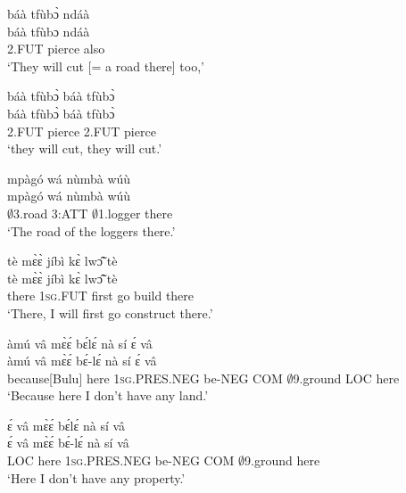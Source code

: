 \begin{exe} 
\exC\label{71} 
  \glll   báà tfùbɔ̀ ndáà \\
        báà tfùbɔ ndáà \\
           2.FUT pierce also  \\
    \trans `They will cut [= a road there] too,'
\end{exe}

\begin{exe} 
\exC\label{72} 
  \glll   báà tfùbɔ̀ báà tfùbɔ̀ \\
           báà tfùbɔ̀ báà tfùbɔ̀ \\
           2.FUT pierce 2.FUT pierce  \\
    \trans `they will cut, they will cut.'
\end{exe}

\begin{exe} 
\exC\label{73}
  \glll  mpàgó wá nùmbà wúù \\
           mpàgó wá nùmbà wúù \\
          $\emptyset$3.road 3:ATT $\emptyset$1.logger there   \\
    \trans `The road of the loggers there.'
\end{exe}

\begin{exe} 
\exC\label{74}
  \glll   tè mɛ̀ɛ̀ jíbì kɛ̀ lwɔ̃̂ tè \\
          tè mɛ̀ɛ̀ jíbì kɛ̀ lwɔ̃̂ tè \\
           there 1\textsc{sg}.FUT first go build there  \\
    \trans `There, I will first go construct there.'
\end{exe}

\begin{exe} 
\exC\label{75}
  \glll  àmú vâ mɛ̀ɛ́ bɛ́lɛ́ nà sí ɛ́ vâ \\
         àmú vâ mɛ̀ɛ́ bɛ́-lɛ́ nà sí ɛ́ vâ \\
           because[Bulu] here 1\textsc{sg}.PRES.NEG be-NEG COM $\emptyset$9.ground LOC here  \\
    \trans `Because here I don't have any land.'
\end{exe}

\begin{exe} 
\exC\label{76} 
  \glll  ɛ́ vâ mɛ̀ɛ́ bɛ́lɛ́ nà sí vâ \\
         ɛ́ vâ mɛ̀ɛ́ bɛ́-lɛ́ nà sí vâ \\
          LOC  here 1\textsc{sg}.PRES.NEG be-NEG COM $\emptyset$9.ground here  \\
    \trans `Here I don't have any property.'
\end{exe}

